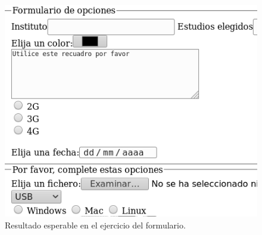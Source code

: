 \documentclass[a4paper, 12pt]{examen}
\begin{document}
\begin{figure}[h]
    \caption{Resultado esperable en el ejercicio del formulario.}
    \label{figuraformulario}
    \includegraphics[scale=0.7]{foto_formulario_12.png}
\end{figure}
\end{document}
